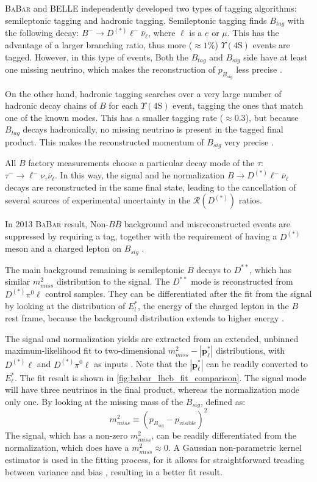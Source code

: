 \documentclass[12pt,letterpaper]{article}
\renewcommand{\vec}[1]{\mathbf{#1}}                   %
\def\BaBar/{\textsc{BaBar}}
\def\Y4S/{\ensuremath{\Upsilon(\text{4S})}}
\def\RDDst/{\ensuremath{\mathcal{R}(D^{(*)})}}
\begin{document}
\BaBar/ and BELLE independently developed two types of tagging algorithms:
semileptonic tagging and hadronic tagging.
Semileptonic tagging finds $B_{tag}$ with the following decay:
$B^- \rightarrow D^{(*)} \ell^- \bar{\nu}_\ell$, where $\ell$ is a $e$ or $\mu$.
This has the advantage of a larger branching ratio, thus more ($\approx 1\%$)
\Y4S/ events are tagged.
However, in this type of events, Both the $B_{tag}$ and $B_{sig}$ side have at least one missing neutrino, which
makes the reconstruction of $p_{B_{sig}}$ less precise \cite{Ciezarek:2017yzh}.

On the other hand, hadronic tagging searches over a very large number of
hadronic decay chains of $B$ for each \Y4S/ event, tagging the ones that match
one of the known modes.
This has a smaller tagging rate ($\approx 0.3$), but because $B_{tag}$ decays
hadronically, no missing neutrino is present in the tagged final product.
This makes the reconstructed momentum of $B_{sig}$ very
precise \cite{Lees:2013uzd,Ciezarek:2017yzh}.

All $B$ factory measurements choose a particular decay mode of the $\tau$:
$\tau^- \rightarrow \ell^- \nu_\tau \bar{\nu}_\ell$. In this way, the signal and
he normalization $B \rightarrow D^{(*)} \ell^- \overline{\nu}_\ell$ decays
are reconstructed in the same final state, leading to the cancellation of 
several sources of experimental uncertainty in the \RDDst/ ratios.

In 2013 \BaBar/ result,
Non-$B \overline{B}$ background and misreconstructed events are suppressed by
requiring a tag, together with the requirement of having a $D^{(*)}$ meson and a
charged lepton on $B_{sig}$ \cite{Ciezarek:2017yzh}.

The main background remaining is semileptonic $B$ decays to $D^{**}$, which has
similar $m^2_{miss}$ distribution to the signal.
The $D^{**}$ mode is reconstructed from $D^{(*)}\pi^0\ell$ control samples.
They can be differentiated after the fit from the signal by looking at the distribution of
$E^{*}_l$, the energy of the charged lepton in the $B$ rest
frame, because the background distribution extends to higher
energy \cite{Ciezarek:2017yzh}.

The signal and normalization yields are extracted from an extended, unbinned maximum-likelihood fit to two-dimensional $m^2_{miss}-|\vec{p}^*_\ell|$ distributions, with $D^{(*)}\ell$ and $D^{(*)}\pi^0\ell$ as inputs \cite{Lees:2013uzd}.
Note that the $|\vec{p}^*_\ell|$ can be readily converted to $E^*_\ell$.
The fit result is shown in \autoref{fig:babar_lhcb_fit_comparison}.
The signal mode will have three neutrinos in the final product,
whereas the normalization mode only one.
By looking at the missing mass of the $B_{sig}$, defined as:
\begin{equation}
    m^2_{miss} \equiv \left(p_{B_{sig}} - p_{visible}\right)^2
\end{equation}
The signal, which has a non-zero $m^2_{miss}$, can be readily differentiated
from the normalization, which does have a $m^2_{miss} \approx 0$.
A Gaussian non-parametric kernel estimator is used in the
fitting process, for it allows for straightforward treading between variance
and bias \cite{Lees:2013uzd}, resulting in a better fit result.
\end{document}
